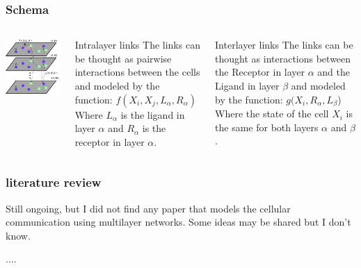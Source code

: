 \documentclass[10pt]{beamer}
\begin{document}
\begin{frame}
    \frametitle{Schema}
    \normalsize  %
    \begin{columns}
            \includegraphics[width=\linewidth]{media/schema.png}

            \begin{block}{Intralayer links}
                The links can be thought as pairwise interactions between the cells and modeled by the function:
                $f(X_i,X_j,L_\alpha,R_\alpha)$
                Where $L_\alpha$ is the ligand in layer $\alpha$ and $R_\alpha$ is the receptor in layer $\alpha$.
            \end{block}
            \begin{block}{Interlayer links}
                The links can be thought as interactions between the Receptor in layer $\alpha$ and the Ligand in layer $\beta$ and modeled by the function:
                $g(X_i, R_\alpha, L_\beta$)
                Where the state of the cell $X_i$ is the same for both layers $\alpha$ and $\beta$.
            \end{block}
    \end{columns}
\end{frame}
\begin{frame}
    \frametitle{literature review}
    Still ongoing, but I did not find any paper that models the cellular communication using multilayer networks.
    Some ideas may be shared but I don't know.

    ....
\end{frame}
\end{document}
